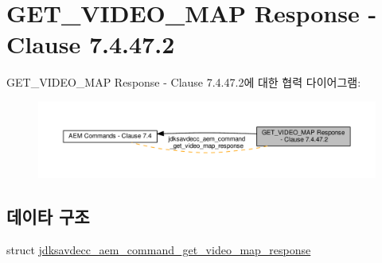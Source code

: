 \hypertarget{group__command__get__video__map__response}{}\section{G\+E\+T\+\_\+\+V\+I\+D\+E\+O\+\_\+\+M\+AP Response -\/ Clause 7.4.47.2}
\label{group__command__get__video__map__response}
G\+E\+T\+\_\+\+V\+I\+D\+E\+O\+\_\+\+M\+AP Response -\/ Clause 7.4.47.2에 대한 협력 다이어그램\+:
\nopagebreak
\begin{figure}[H]
\begin{center}
\leavevmode
\includegraphics[width=350pt]{group__command__get__video__map__response}
\end{center}
\end{figure}
\subsection*{데이타 구조}
\begin{DoxyCompactItemize}
\item 
struct \hyperlink{structjdksavdecc__aem__command__get__video__map__response}{jdksavdecc\+\_\+aem\+\_\+command\+\_\+get\+\_\+video\+\_\+map\+\_\+response}
\end{DoxyCompactItemize}

